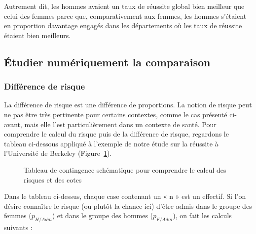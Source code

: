 \documentclass[
  letterpaper,
]{book}
\begin{document}
Autrement dit, les hommes avaient un taux de réussite global bien
meilleur que celui des femmes parce que, comparativement aux femmes, les
hommes s'étaient en proportion davantage engagés dans les départements
où les taux de réussite étaient bien meilleurs.

\subsection{Étudier numériquement la
comparaison}\label{uxe9tudier-numuxe9riquement-la-comparaison-2}

\subsubsection{Différence de risque}\label{diffuxe9rence-de-risque}

La différence de risque est une différence de proportions. La notion de
risque peut ne pas être très pertinente pour certains contextes, comme
le cas présenté ci-avant, mais elle l'est particulièrement dans un
contexte de santé. Pour comprendre le calcul du risque puis de la
différence de risque, regardons le tableau ci-dessous appliqué à
l'exemple de notre étude sur la réussite à l'Université de Berkeley
(Figure~\ref{fig-RiskContTables}).

\begin{figure}


\caption{\label{fig-RiskContTables}Tableau de contingence schématique
pour comprendre le calcul des risques et des cotes}

\end{figure}%

Dans le tableau ci-dessus, chaque case contenant un « n » est un
effectif. Si l'on désire connaître le risque (ou plutôt la chance ici)
d'être admis dans le groupe des femmes (\(p_{H/Adm}\)) et dans le groupe
des hommes (\(p_{F/Adm}\)), on fait les calculs suivants :
\end{document}
